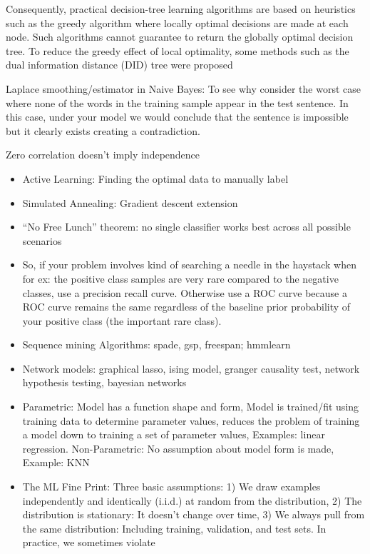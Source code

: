 \documentclass[]{book}
\begin{document}
Consequently, practical decision-tree learning algorithms are based on
heuristics such as the greedy algorithm where locally optimal decisions
are made at each node. Such algorithms cannot guarantee to return the
globally optimal decision tree. To reduce the greedy effect of local
optimality, some methods such as the dual information distance (DID)
tree were proposed

Laplace smoothing/estimator in Naive Bayes: To see why consider the
worst case where none of the words in the training sample appear in the
test sentence. In this case, under your model we would conclude that the
sentence is impossible but it clearly exists creating a contradiction.

Zero correlation doesn't imply independence

\begin{itemize}
\item
  Active Learning: Finding the optimal data to manually label
\item
  Simulated Annealing: Gradient descent extension
\item
  ``No Free Lunch'' theorem: no single classifier works best across all
  possible scenarios
\item
  So, if your problem involves kind of searching a needle in the
  haystack when for ex: the positive class samples are very rare
  compared to the negative classes, use a precision recall curve.
  Otherwise use a ROC curve because a ROC curve remains the same
  regardless of the baseline prior probability of your positive class
  (the important rare class).
\item
  Sequence mining Algorithms: spade, gsp, freespan; hmmlearn
\item
  Network models: graphical lasso, ising model, granger causality test,
  network hypothesis testing, bayesian networks
\item
  Parametric: Model has a function shape and form, Model is trained/fit
  using training data to determine parameter values, reduces the problem
  of training a model down to training a set of parameter values,
  Examples: linear regression. Non-Parametric: No assumption about model
  form is made, Example: KNN
\item
  The ML Fine Print: Three basic assumptions: 1) We draw examples
  independently and identically (i.i.d.) at random from the
  distribution, 2) The distribution is stationary: It doesn't change
  over time, 3) We always pull from the same distribution: Including
  training, validation, and test sets. In practice, we sometimes violate

\end{itemize}
\end{document}

